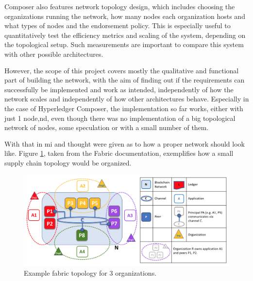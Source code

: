 Composer also features network topology design, which includes choosing the organizations running the network, how many nodes each organization hosts and what types of nodes and the endorsement policy. This is especially useful to quantitatively test the efficiency metrics and scaling of the system, depending on the topological setup. Such measurements are important to compare this system with other possible architectures.

However, the scope of this project covers mostly the qualitative and functional part of building the network, with the aim of finding out if the requirements can successfully be implemented and work as intended, independently of how the network scales and independently of how other architectures behave. Especially in the case of Hyperledger Composer, the implementation so far works, either with just 1 node,nd, even though there was no implementation of a big topological network of nodes, some speculation or with a small number of them. 

With that in mi and thought were given as to how a proper network should look like. Figure \ref{fig:fabric_topology}, taken from the Fabric documentation, exemplifies how a small supply chain topology would be organized.

\begin{figure}[h]
    \centering
    \includegraphics[scale=0.50]{media/fabric_topology.png}
    \caption[Example fabric topology for 3 organizations.]{Example fabric topology for 3 organizations.}
    \label{fig:fabric_topology}
\end{figure}




